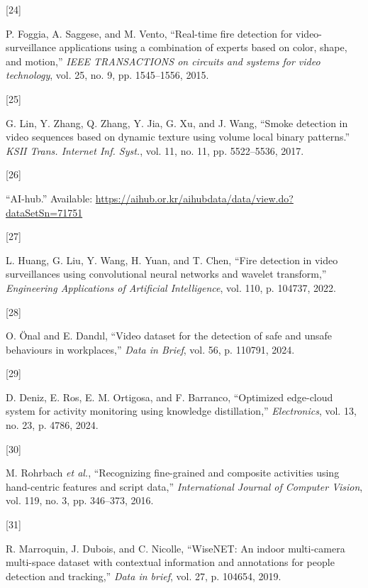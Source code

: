 \documentclass[
  10pt,
]{article}
\newlength{\cslhangindent}
\newlength{\csllabelwidth}
\newenvironment{CSLReferences}[2] %
 {\begin{list}{}{%
  \setlength{\itemindent}{0pt}
  \setlength{\leftmargin}{0pt}
  \setlength{\parsep}{0pt}
  \ifodd #1
   \setlength{\leftmargin}{\cslhangindent}
   \setlength{\itemindent}{-1\cslhangindent}
  \fi
  \setlength{\itemsep}{#2\baselineskip}}}
 {\end{list}}
\newcommand{\CSLLeftMargin}[1]{\parbox[t]{\csllabelwidth}{\strut#1\strut}}
\newcommand{\CSLRightInline}[1]{\parbox[t]{\linewidth - \csllabelwidth}{\strut#1\strut}}
\begin{document}
\begin{CSLReferences}{0}{0}
\CSLLeftMargin{{[}24{]} }%
\CSLRightInline{P. Foggia, A. Saggese, and M. Vento, {``Real-time fire
detection for video-surveillance applications using a combination of
experts based on color, shape, and motion,''} \emph{IEEE TRANSACTIONS on
circuits and systems for video technology}, vol. 25, no. 9, pp.
1545--1556, 2015.}

\CSLLeftMargin{{[}25{]} }%
\CSLRightInline{G. Lin, Y. Zhang, Q. Zhang, Y. Jia, G. Xu, and J. Wang,
{``Smoke detection in video sequences based on dynamic texture using
volume local binary patterns.''} \emph{KSII Trans. Internet Inf. Syst.},
vol. 11, no. 11, pp. 5522--5536, 2017.}

\CSLLeftMargin{{[}26{]} }%
\CSLRightInline{{``AI-hub.''} Available:
\url{https://aihub.or.kr/aihubdata/data/view.do?dataSetSn=71751}}

\CSLLeftMargin{{[}27{]} }%
\CSLRightInline{L. Huang, G. Liu, Y. Wang, H. Yuan, and T. Chen, {``Fire
detection in video surveillances using convolutional neural networks and
wavelet transform,''} \emph{Engineering Applications of Artificial
Intelligence}, vol. 110, p. 104737, 2022.}

\CSLLeftMargin{{[}28{]} }%
\CSLRightInline{O. Önal and E. Dandıl, {``Video dataset for the
detection of safe and unsafe behaviours in workplaces,''} \emph{Data in
Brief}, vol. 56, p. 110791, 2024.}

\CSLLeftMargin{{[}29{]} }%
\CSLRightInline{D. Deniz, E. Ros, E. M. Ortigosa, and F. Barranco,
{``Optimized edge-cloud system for activity monitoring using knowledge
distillation,''} \emph{Electronics}, vol. 13, no. 23, p. 4786, 2024.}

\CSLLeftMargin{{[}30{]} }%
\CSLRightInline{M. Rohrbach \emph{et al.}, {``Recognizing fine-grained
and composite activities using hand-centric features and script data,''}
\emph{International Journal of Computer Vision}, vol. 119, no. 3, pp.
346--373, 2016.}

\CSLLeftMargin{{[}31{]} }%
\CSLRightInline{R. Marroquin, J. Dubois, and C. Nicolle, {``WiseNET: An
indoor multi-camera multi-space dataset with contextual information and
annotations for people detection and tracking,''} \emph{Data in brief},
vol. 27, p. 104654, 2019.}


\end{CSLReferences}
\end{document}
